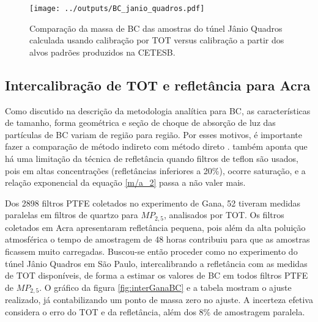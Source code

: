 \begin{figure}[H]
  \centering
  \begin{minipage}[b]{0.5\linewidth}
    \texttt{[image: ../outputs/BC\_janio\_quadros.pdf]}
    \caption{Comparação da massa de BC das amostras do túnel Jânio Quadros 
             calculada usando calibração por TOT versus calibração a partir dos 
             alvos padrões produzidos na CETESB. \label{fig:JQ}}
  \end{minipage}
  \hspace{0.5cm}
  \begin{minipage}[b]{0.45\linewidth}
    \begin{small}
      
    \end{small}
  \end{minipage}
\end{figure}

\newpage
\subsection{Intercalibração de TOT e refletância para Acra}

Como discutido na descrição da metodologia analítica para BC, as características
de tamanho, forma geométrica e seção de choque de absorção de luz das 
partículas de BC variam de região para região.
Por esses motivos, é importante fazer a comparação de método indireto com método
direto \citep{quincey2007}. \citet{taha2007} também aponta que há uma limitação 
da técnica de refletância quando filtros de teflon são usados, pois em altas 
concentrações (refletâncias inferiores a 20\%), ocorre saturação, e a 
relação exponencial da equação \ref{m/a_2} passa a não valer 
mais. 

Dos 2898 filtros PTFE coletados no experimento de Gana, 52 tiveram medidas 
paralelas em filtros de quartzo para $MP_{2,5}$, analisados por TOT.
Os filtros coletados em Acra apresentaram refletância pequena, pois além da 
alta poluição atmosférica o tempo de amostragem de 48 horas contribuiu para que
as amostras ficassem muito carregadas. Buscou-se então proceder como no 
experimento do túnel Jânio Quadros em São Paulo, intercalibrando a refletância 
com as medidas de TOT disponíveis, de forma a estimar os valores de BC em todos 
filtros PTFE de $MP_{2,5}$. O gráfico da figura \ref{fig:interGanaBC} e a 
tabela \label{table:interGanaBC} mostram o ajuste realizado, já contabilizando 
um ponto de massa zero no ajuste. A incerteza efetiva considera o erro do TOT 
e da refletância, além dos 8\% de amostragem paralela. 

